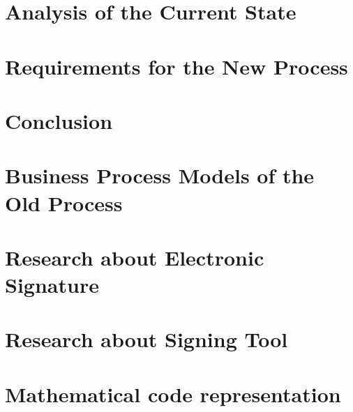 	\chapter{Analysis of the Current State}
	\label{ch:analysis}
	
	
	\chapter{Requirements for the New Process}
	
	
	\chapter{Conclusion}
	
	
	\printbibliography
	
	\clearpage
	\appendix
	\chapter{Business Process Models of the Old Process}
	\label{bpmnOld}
	
	
	\chapter{Research about Electronic Signature}
	\label{res:es}
	
	
	\chapter{Research about Signing Tool}
	\label{res:tool}
	
	
	\chapter{Mathematical code representation}
	\label{mathCode}
	
	
%	
	
	
	

